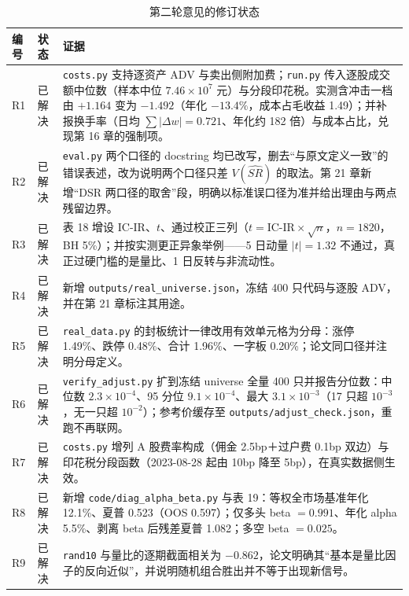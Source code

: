 \documentclass[11pt,a4paper]{ctexart}
\begin{document}
\begin{table}[htbp]
\centering
\caption{第二轮意见的修订状态}
\label{tab:status}
\begin{tabular}{@{}>{\raggedright\arraybackslash}p{0.9cm}>{\raggedright\arraybackslash}p{1.2cm}>{\raggedright\arraybackslash}p{11.3cm}@{}}
\toprule
编号 & 状态 & 证据 \\
\midrule
R1 & 已解决 & \texttt{costs.py} 支持逐资产 ADV 与卖出侧附加费；\texttt{run.py} 传入逐股成交额中位数（样本中位 $7.46\times10^7$ 元）与分段印花税。实测含冲击一档由 $+1.164$ 变为 $-1.492$（年化 $-13.4\%$，成本占毛收益 1.49）；并补报换手率（日均 $\sum|\Delta w|=0.721$、年化约 182 倍）与成本占比，兑现第 16 章的强制项。 \\
R2 & 已解决 & \texttt{eval.py} 两个口径的 docstring 均已改写，删去“与原文定义一致”的错误表述，改为说明两个口径只差 $V(\widehat{SR})$ 的取法。第 21 章新增“DSR 两口径的取舍”段，明确以标准误口径为准并给出理由与两点残留边界。 \\
R3 & 已解决 & 表 18 增设 IC-IR、$t$、通过校正三列（$t=\text{IC-IR}\times\sqrt{n}$，$n=1820$，BH 5\%）；并按实测更正异象举例——5 日动量 $|t|=1.32$ 不通过，真正过硬门槛的是量比、1 日反转与非流动性。 \\
R4 & 已解决 & 新增 \texttt{outputs/real\_universe.json}，冻结 400 只代码与逐股 ADV，并在第 21 章标注其用途。 \\
R5 & 已解决 & \texttt{real\_data.py} 的封板统计一律改用有效单元格为分母：涨停 1.49\%、跌停 0.48\%、合计 1.96\%、一字板 0.20\%；论文同口径并注明分母定义。 \\
R6 & 已解决 & \texttt{verify\_adjust.py} 扩到冻结 universe 全量 400 只并报告分位数：中位数 $2.3\times10^{-4}$、95 分位 $9.1\times10^{-4}$、最大 $3.1\times10^{-3}$（17 只超 $10^{-3}$，无一只超 $10^{-2}$）；参考价缓存至 \texttt{outputs/adjust\_check.json}，重跑不再联网。 \\
R7 & 已解决 & \texttt{costs.py} 增列 A 股费率构成（佣金 2.5bp＋过户费 0.1bp 双边）与印花税分段函数（2023-08-28 起由 10bp 降至 5bp），在真实数据侧生效。 \\
R8 & 已解决 & 新增 \texttt{code/diag\_alpha\_beta.py} 与表 19：等权全市场基准年化 12.1\%、夏普 0.523（OOS 0.597）；仅多头 beta $=0.991$、年化 alpha 5.5\%、剥离 beta 后残差夏普 1.082；多空 beta $=0.025$。 \\
R9 & 已解决 & \texttt{rand10} 与量比的逐期截面相关为 $-0.862$，论文明确其“基本是量比因子的反向近似”，并说明随机组合胜出并不等于出现新信号。 \\
\bottomrule
\end{tabular}
\end{table}
\end{document}
